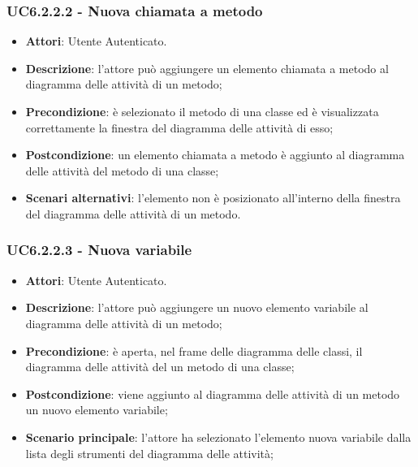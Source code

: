\subsubsection{UC6.2.2.2 - Nuova chiamata a metodo} 
\label{sssec:UC6.2.2.2} 
\begin{itemize} 
\item \textbf{Attori}: Utente Autenticato.
\item \textbf{Descrizione}: l'attore può aggiungere un elemento chiamata a metodo al diagramma delle attività di un metodo;
\item \textbf{Precondizione}: è selezionato il metodo di una classe ed è visualizzata correttamente la finestra del diagramma delle attività di esso;
\item \textbf{Postcondizione}: un elemento chiamata a metodo è aggiunto al diagramma delle attività del metodo di una classe;
\item \textbf{Scenari alternativi}: l'elemento non è posizionato all'interno della finestra del diagramma delle attività di un metodo.
\end{itemize} 
\subsubsection{UC6.2.2.3 - Nuova variabile} 
\label{sssec:UC6.2.2.3} 
\begin{itemize} 
\item \textbf{Attori}: Utente Autenticato.
\item \textbf{Descrizione}: l'attore può aggiungere un nuovo elemento variabile al diagramma delle attività di un metodo;
\item \textbf{Precondizione}: è aperta, nel frame delle diagramma delle  classi, il diagramma delle attività del un metodo di una classe;
\item \textbf{Postcondizione}: viene aggiunto al diagramma delle attività di un metodo un nuovo elemento variabile;
\item \textbf{Scenario principale}: l'attore ha selezionato l'elemento nuova variabile dalla lista degli strumenti del diagramma delle attività;\end{itemize} 
